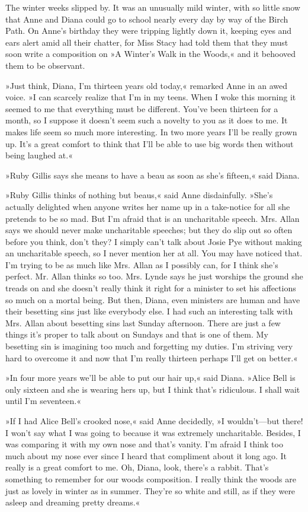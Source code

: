 The winter weeks slipped by. It was an unusually mild winter, with so little snow that Anne and Diana could go to school nearly every day by way of the Birch Path. On Anne's birthday they were tripping lightly down it, keeping eyes and ears alert amid all their chatter, for Miss Stacy had told them that they must soon write a composition on »A Winter's Walk in the Woods,« and it behooved them to be observant.

»Just think, Diana, I'm thirteen years old today,« remarked Anne in an awed voice. »I can scarcely realize that I'm in my teens. When I woke this morning it seemed to me that everything must be different. You've been thirteen for a month, so I suppose it doesn't seem such a novelty to you as it does to me. It makes life seem so much more interesting. In two more years I'll be really grown up. It's a great comfort to think that I'll be able to use big words then without being laughed at.«

»Ruby Gillis says she means to have a beau as soon as she's fifteen,« said Diana.

»Ruby Gillis thinks of nothing but beaus,« said Anne disdainfully. »She's actually delighted when anyone writes her name up in a take-notice for all she pretends to be so mad. But I'm afraid that is an uncharitable speech. Mrs. Allan says we should never make uncharitable speeches; but they do slip out so often before you think, don't they? I simply can't talk about Josie Pye without making an uncharitable speech, so I never mention her at all. You may have noticed that. I'm trying to be as much like Mrs. Allan as I possibly can, for I think she's perfect. Mr. Allan thinks so too. Mrs. Lynde says he just worships the ground she treads on and she doesn't really think it right for a minister to set his affections so much on a mortal being. But then, Diana, even ministers are human and have their besetting sins just like everybody else. I had such an interesting talk with Mrs. Allan about besetting sins last Sunday afternoon. There are just a few things it's proper to talk about on Sundays and that is one of them. My besetting sin is imagining too much and forgetting my duties. I'm striving very hard to overcome it and now that I'm really thirteen perhaps I'll get on better.«

»In four more years we'll be able to put our hair up,« said Diana. »Alice Bell is only sixteen and she is wearing hers up, but I think that's ridiculous. I shall wait until I'm seventeen.«

»If I had Alice Bell's crooked nose,« said Anne decidedly, »I wouldn't—but there! I won't say what I was going to because it was extremely uncharitable. Besides, I was comparing it with my own nose and that's vanity. I'm afraid I think too much about my nose ever since I heard that compliment about it long ago. It really is a great comfort to me. Oh, Diana, look, there's a rabbit. That's something to remember for our woods composition. I really think the woods are just as lovely in winter as in summer. They're so white and still, as if they were asleep and dreaming pretty dreams.«

